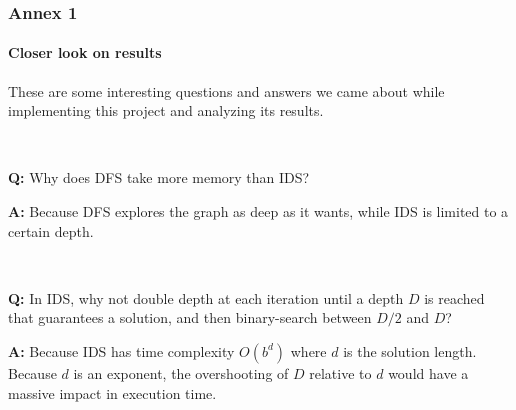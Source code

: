 \documentclass{beamer}
\begin{document}
\begin{frame}
  \frametitle{Annex 1}
  \framesubtitle{Closer look on results}

  These are some interesting questions and answers we came about while implementing this project and analyzing its results.

  ~
  
  \textbf{Q:} Why does DFS take more memory than IDS?
  
  \textbf{A:} Because DFS explores the graph as deep as it wants, while IDS is limited to a certain depth.
  
  ~

  \textbf{Q:} In IDS, why not double depth at each iteration until a depth $D$ is reached that guarantees a solution, and then binary-search between $D/2$ and $D$?

  \textbf{A:} Because IDS has time complexity $O(b^d)$ where $d$ is the solution length. Because $d$ is an exponent, the overshooting of $D$ relative to $d$ would have a massive impact in execution time.

\end{frame}
\end{document}
